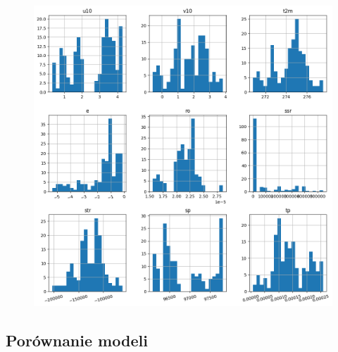 \begin{figure}[H]
    \centering
    \includegraphics[width=\textwidth]{images/dt_hist.png}
    \caption{}
    \label{dt-hist}
\end{figure}




\subsection{Porównanie modeli}

